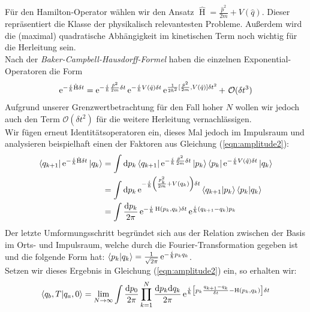 Für den Hamilton-Operator wählen wir den Ansatz $\hat{\operatorname{H}} = \frac{\hat{p}^2}{2m} + V(\hat{q})$. Dieser repräsentiert die Klasse der physikalisch relevantesten Probleme. Außerdem wird die (maximal) quadratische Abhängigkeit im kinetischen Term noch wichtig für die Herleitung sein.\\
Nach der \textit{Baker-Campbell-Hausdorff-Formel} haben die einzelnen Exponential-Operatoren die Form
\begin{align}
	\operatorname{e}^{-\frac{i}{\hbar}\hat{\operatorname{H}}\delta t} = \operatorname{e}^{-\frac{i}{\hbar}\frac{\hat{p}^2}{2m}\delta t}\operatorname{e}^{-\frac{i}{\hbar} V(\hat{q})\delta t}\operatorname{e}^{\frac{1}{2\hbar^2}[\frac{\hat{p}^2}{2m},V(\hat{q})]\delta t^2} + \ \mathcal{O}(\delta t^3)
\end{align}
Aufgrund unserer Grenzwertbetrachtung für den Fall hoher $N$ wollen wir jedoch auch den Term $\mathcal{O}(\delta t^2)$ für die weitere Herleitung vernachlässigen. \\
Wir fügen erneut Identitätsoperatoren ein, dieses Mal jedoch im Impulsraum und analysieren beispielhaft einen der Faktoren aus Gleichung (\ref{eqn:amplitude2}):
\begin{align}
	\bra{q_{k+1}}\operatorname{e}^{-\frac{i}{\hbar}\hat{\operatorname{H}}\delta t}\ket{q_k} &= \int \dd p_k \bra{q_{k+1}}\operatorname{e}^{-\frac{i}{\hbar}\frac{\hat{p}^2}{2m}\delta t}\ket{p_k}\bra{p_k}\operatorname{e}^{-\frac{i}{\hbar} V(\hat{q})\delta t}\ket{q_k} \nonumber \\
	&= \int \dd p_k \operatorname{e}^{-\frac{i}{\hbar}\left(\frac{p_k^2}{2m} +V(q_k)\right)\delta t}\bra{q_{k+1}}\ket{p_k}\bra{p_k}\ket{q_k} \nonumber \\
	&= \int \frac{\dd p_k}{2\pi} \operatorname{e}^{-\frac{i}{\hbar} \operatorname{H}(p_k,q_k)\delta t} \operatorname{e}^{\frac{i}{\hbar}(q_{k+1}-q_k)p_k}
\end{align}
Der letzte Umformungsschritt begründet sich aus der Relation zwischen der Basis im Orts- und Impulsraum, welche durch die Fourier-Transformation gegeben ist und die folgende Form hat: $\braket{p_k}{q_k} = \frac{1}{\sqrt{2\pi}} \operatorname{e}^{-\frac{i}{\hbar} p_kq_k}$. \\
Setzen wir dieses Ergebnis in Gleichung (\ref{eqn:amplitude2}) ein, so erhalten wir: 
\begin{align}
	\braket{q_b,T}{q_a,0} = \lim_{N\rightarrow\infty} \int \frac{\dd p_0}{2\pi} \prod_{k=1}^N \frac{\dd p_k\dd q_k}{2\pi} \operatorname{e}^{\frac{i}{\hbar}\left[p_k\frac{q_{k+1}-q_k}{\delta t} - \operatorname{H}(p_k,q_k)\right]\delta t}
\end{align}
